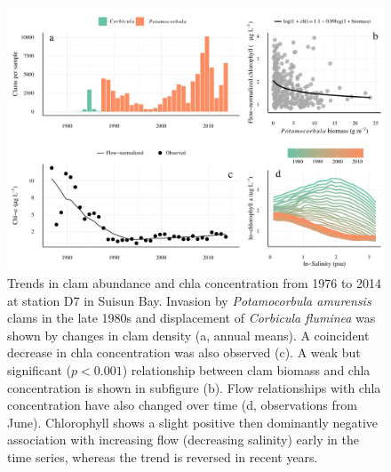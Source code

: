 \documentclass[letterpaper,12pt,oneside]{article}\usepackage[]{graphicx}\usepackage[]{color}
\begin{document}
\begin{figure}[!ht]

{\centering \includegraphics[width=\textwidth]{figs/clmchl-1} 

}

\caption{Trends in clam abundance and \ac{chla} concentration from 1976 to 2014 at station D7 in Suisun Bay.  Invasion by \textit{Potamocorbula amurensis} clams in the late 1980s and displacement of \textit{Corbicula fluminea} was shown by changes in clam density (a, annual means).  A coincident decrease in \ac{chla} concentration was also observed (c).  A weak but significant ($p < 0.001$) relationship between clam biomass and \ac{chla} concentration is shown in subfigure (b).  Flow relationships with \ac{chla} concentration have also changed over time (d, observations from June). Chlorophyll shows a slight positive then dominantly negative association with increasing flow (decreasing salinity) early in the time series, whereas the trend is reversed in recent years.}\label{fig:clmchl}
\end{figure}



\clearpage
\end{document}
